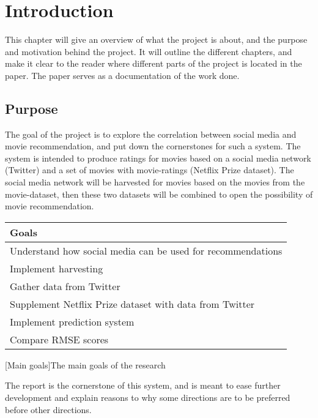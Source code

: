 
\chapter{Introduction}

\minitoc
\setcounter{page}{1}

This chapter will give an overview of what the project is about, and the purpose and motivation behind the project. It will outline the different chapters, and make it clear to the reader where different parts of the project is located in the paper. The paper serves as a documentation of the work done.

\clearpage


\section{Purpose}
The goal of the project is to explore the correlation between social media and movie recommendation, and put down the cornerstones for such a system. The system is intended to produce ratings for movies based on a social media network (Twitter) and a set of movies with movie-ratings (Netflix Prize dataset). The social media network will be harvested for movies based on the movies from the movie-dataset, then these two datasets will be combined to open the possibility of movie recommendation.

\begin{table}[H]
    \centering
    \begin{tabular}{ l }
        \textbf{Goals} \\ \hline
        Understand how social media can be used for recommendations \\
        Implement harvesting \\
        Gather data from Twitter \\
        Supplement Netflix Prize dataset with data from Twitter \\
        Implement prediction system \\
        Compare RMSE scores \\
    \end{tabular}
    [Main goals]{The main goals of the research}
    \label{tab:main-goals}
\end{table}

The report is the cornerstone of this system, and is meant to ease further development and explain reasons to why some directions are to be preferred before other directions.


